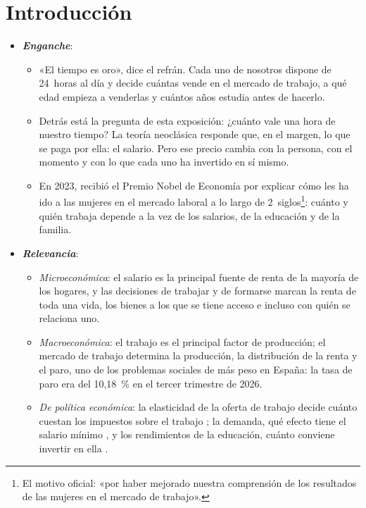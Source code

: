 \documentclass[11pt]{article}
\begin{document}
\tceetitulo

\section*{Introducción}

\begin{itemize}
\item \textbf{\emph{Enganche}}:
  \begin{itemize}
  \item «El tiempo es oro», dice el refrán. Cada uno de nosotros dispone de 24~horas al día y decide cuántas vende en el mercado de trabajo, a qué edad empieza a venderlas y cuántos años estudia antes de hacerlo.
  \item Detrás está la pregunta de esta exposición: ¿cuánto vale una hora de nuestro tiempo? La teoría neoclásica responde que, en el margen, lo que se paga por ella: el salario. Pero ese precio cambia con la persona, con el momento y con lo que cada uno ha invertido en sí mismo.
  \item En 2023,  recibió el Premio Nobel de Economía por explicar cómo les ha ido a las mujeres en el mercado laboral a lo largo de 2~siglos\nocite{Nobel2023Goldin}\footnote{El motivo oficial: «por haber mejorado nuestra comprensión de los resultados de las mujeres en el mercado de trabajo»\nocite{Nobel2023Goldin}.}: cuánto y quién trabaja depende a la vez de los salarios, de la educación y de la familia.
  \end{itemize}

\item \textbf{\emph{Relevancia}}:
  \begin{itemize}
  \item \emph{Microeconómica}: el salario es la principal fuente de renta de la mayoría de los hogares, y las decisiones de trabajar y de formarse marcan la renta de toda una vida, los bienes a los que se tiene acceso e incluso con quién se relaciona uno.
  \item \emph{Macroeconómica}: el trabajo es el principal factor de producción; el mercado de trabajo determina la producción, la distribución de la renta y el paro, uno de los problemas sociales de más peso en España: la tasa de paro era del 10{,}18~\% en el tercer trimestre de 2026\nocite{INE2026EPA3T,INE2026EPATabla65334}.
  \item \emph{De política económica}: la elasticidad de la oferta de trabajo decide cuánto cuestan los impuestos sobre el trabajo ; la demanda, qué efecto tiene el salario mínimo , y los rendimientos de la educación, cuánto conviene invertir en ella .
  \end{itemize}


\end{itemize}
\end{document}
